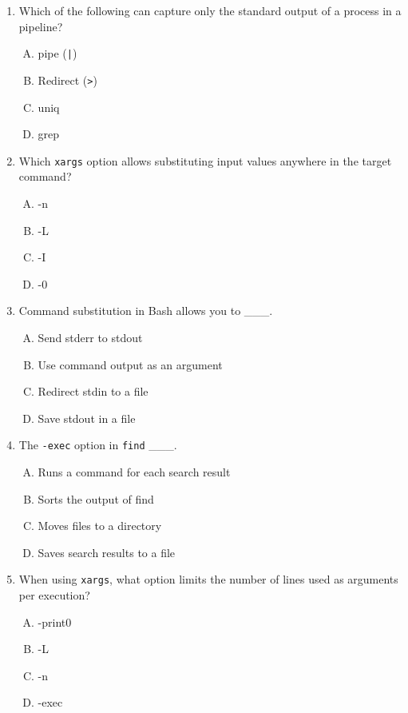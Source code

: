 \documentclass[a4paper]{report}
\begin{document}
\begin{enumerate}[1.]
    \item Which of the following can capture only the standard output of a process in a pipeline?  
    \begin{enumerate}[A)]
        \item pipe (\texttt{|})  
        \item Redirect (\texttt{>})  
        \item uniq  
        \item grep  
    \end{enumerate}

    \item Which \texttt{xargs} option allows substituting input values anywhere in the target command?  
    \begin{enumerate}[A)]
        \item -n  
        \item -L  
        \item -I  
        \item -0  
    \end{enumerate}

    \item Command substitution in Bash allows you to \_\_\_.  
    \begin{enumerate}[A)]
        \item Send stderr to stdout  
        \item Use command output as an argument  
        \item Redirect stdin to a file  
        \item Save stdout in a file  
    \end{enumerate}

    \item The \texttt{-exec} option in \texttt{find} \_\_\_.  
    \begin{enumerate}[A)]
        \item Runs a command for each search result  
        \item Sorts the output of find  
        \item Moves files to a directory  
        \item Saves search results to a file  
    \end{enumerate}

    \item When using \texttt{xargs}, what option limits the number of lines used as arguments per execution?  
    \begin{enumerate}[A)]
        \item -print0  
        \item -L  
        \item -n  
        \item -exec  
    \end{enumerate}


\end{enumerate}
\end{document}
